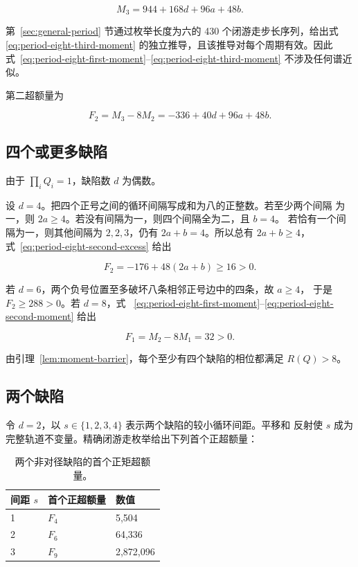 \begin{equation}
\label{eq:period-eight-third-moment}
M_{3}=944+168d+96a+48b.
\end{equation}

第~\ref{sec:general-period} 节通过枚举长度为六的 430 个闭游走步长序列，给出式~
\eqref{eq:period-eight-third-moment} 的独立推导，且该推导对每个周期有效。因此
式~\eqref{eq:period-eight-first-moment}--\eqref{eq:period-eight-third-moment}
不涉及任何谱近似。

第二超额量为

\begin{equation}
\label{eq:period-eight-second-excess}
F_{2}=M_{3}-8M_{2}=-336+40d+96a+48b.
\end{equation}

\subsection{四个或更多缺陷}\label{subsec:four-or-more-defects}

由于 \(\prod_iQ_i=1\)，缺陷数 \(d\) 为偶数。

设 \(d=4\)。把四个正号之间的循环间隔写成和为八的正整数。若至少两个间隔
为一，则 \(2a\geq4\)。若没有间隔为一，则四个间隔全为二，且 \(b=4\)。
若恰有一个间隔为一，则其他间隔为 \(2,2,3\)，仍有 \(2a+b=4\)。所以总有
\(2a+b\geq4\)，式~\eqref{eq:period-eight-second-excess} 给出

\begin{equation}
F_{2}=-176+48(2a+b)\geq 16>0.
\end{equation}

若 \(d=6\)，两个负号位置至多破坏八条相邻正号边中的四条，故 \(a\geq4\)，
于是 \(F_2\geq288>0\)。若 \(d=8\)，式~
\eqref{eq:period-eight-first-moment}--\eqref{eq:period-eight-second-moment} 给出

\begin{equation}
F_{1}=M_{2}-8M_{1}=32>0.
\end{equation}

由引理~\ref{lem:moment-barrier}，每个至少有四个缺陷的相位都满足 \(R(Q)>8\)。

\subsection{两个缺陷}\label{subsec:two-defects}

令 \(d=2\)，以 \(s\in\{1,2,3,4\}\) 表示两个缺陷的较小循环间距。平移和
反射使 \(s\) 成为完整轨道不变量。精确闭游走枚举给出下列首个正超额量：

\begin{table}[tbp]
\centering
\caption{两个非对径缺陷的首个正矩超额量。}
\label{tab:two-defect-excesses}
\begingroup
\renewcommand{\arraystretch}{1.12}
\begin{tabular}{lll}
\toprule
间距 \(s\) & 首个正超额量 & 数值 \\
\midrule
1 & \(F_{4}\) & 5,504 \\
2 & \(F_{6}\) & 64,336 \\
3 & \(F_{9}\) & 2,872,096 \\
\bottomrule
\end{tabular}
\endgroup
\end{table}

